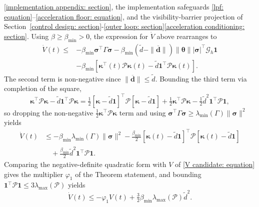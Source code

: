 \documentclass{IEEEtaes}
\begin{document}
\ref{implementation appendix: section}, the implementation safeguards \eqref{lpf: equation}--\eqref{acceleration floor: equation}, and the visibility-barrier projection of Section~\ref{control design: section}-\ref{outer loop: section}\ref{acceleration conditioning: section}. Using $\beta\ge\beta_{\min}>0$, the expression for $\dot{V}$ above rearranges to
\begin{align*}
\dot{V}(t)\le& -\beta_{\min}\boldsymbol{\sigma}^\top\Gamma\boldsymbol{\sigma} - \beta_{\min}(\tilde{d}-\|\boldsymbol{\overline{d}}\|)\|\boldsymbol{\theta}\||\boldsymbol{\sigma}|^\top\mathcal{G}_h\boldsymbol{1}\\
&- \beta_{\min}[\boldsymbol{\kappa}^\top(t)\mathcal{P}\boldsymbol{\kappa}(t) - \tilde{d}\boldsymbol{1}^\top\mathcal{P}\boldsymbol{\kappa}(t)].
\end{align*}
The second term is non-negative since $\|\boldsymbol{\overline{d}}\|\le\tilde{d}$. Bounding the third term via completion of the square,
\begin{equation*}
    \boldsymbol{\kappa}^\top\mathcal{P}\boldsymbol{\kappa} - \tilde{d}\boldsymbol{1}^\top\mathcal{P}\boldsymbol{\kappa} = \tfrac12[\boldsymbol{\kappa}-\tilde{d}\boldsymbol{1}]^\top\mathcal{P}[\boldsymbol{\kappa}-\tilde{d}\boldsymbol{1}] + \tfrac12\boldsymbol{\kappa}^\top\mathcal{P}\boldsymbol{\kappa} - \tfrac12\tilde{d}^2\boldsymbol{1}^\top\mathcal{P}\boldsymbol{1},
\end{equation*}
so dropping the non-negative $\tfrac12\boldsymbol{\kappa}^\top\mathcal{P}\boldsymbol{\kappa}$ term and using $\boldsymbol{\sigma}^\top\Gamma\boldsymbol{\sigma}\ge\lambda_{\min}(\Gamma)\|\boldsymbol{\sigma}\|^2$ yields
\begin{align*}
\dot{V}(t)&\le -\beta_{\min}\lambda_{\min}(\Gamma)\|\boldsymbol{\sigma}\|^2 - \tfrac{\beta_{\min}}{2}[\boldsymbol{\kappa}(t)-\tilde{d}\boldsymbol{1}]^\top\mathcal{P}[\boldsymbol{\kappa}(t)-\tilde{d}\boldsymbol{1}]\\
&\quad + \tfrac{\beta_{\min}}{2}\tilde{d}^2\boldsymbol{1}^\top\mathcal{P}\boldsymbol{1}.
\end{align*}
Comparing the negative-definite quadratic form with $V$ of \eqref{V candidate: equation} gives the multiplier $\varphi_1$ of the Theorem statement, and bounding $\boldsymbol{1}^\top\mathcal{P}\boldsymbol{1}\le 3\lambda_{\max}(\mathcal{P})$ yields
\begin{equation} \label{Vdot bound: equation}
    \dot{V}(t)\le -\varphi_1 V(t) + \tfrac32\beta_{\min}\lambda_{\max}(\mathcal{P})\tilde{d}^2.
\end{equation}
\end{document}
